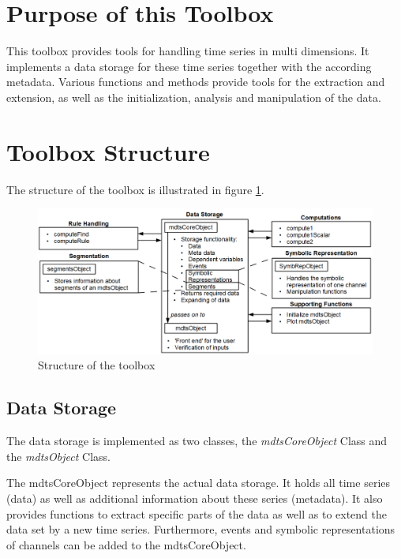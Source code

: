 \documentclass[a4]{scrreprt}
\begin{document}
\section{Purpose of this Toolbox}

This toolbox provides tools for handling time series in multi dimensions. It implements a data storage for these time series together with the according metadata. Various functions and methods provide tools for the extraction and extension, as well as the initialization, analysis and manipulation of the data.

\section{Toolbox Structure}

The structure of the toolbox is illustrated in figure \ref{FigToolboxStructure}.

\begin{figure}[htbp]
	\centering
	\includegraphics[width=\textwidth]{Media/ToolboxStructure.png}
	\caption{Structure of the toolbox}
	\label{FigToolboxStructure}
\end{figure}

\subsection{Data Storage}
\label{ChpIDDataStorage}

The data storage is implemented as two classes, the \textit{mdtsCoreObject} Class and the \textit{mdtsObject} Class.

The mdtsCoreObject represents the actual data storage. It holds all time series (data) as well as additional information about these series (metadata). It also provides functions to extract specific parts of the data as well as to extend the data set by a new time series. Furthermore, events and symbolic representations of channels can be added to the mdtsCoreObject.
\end{document}
